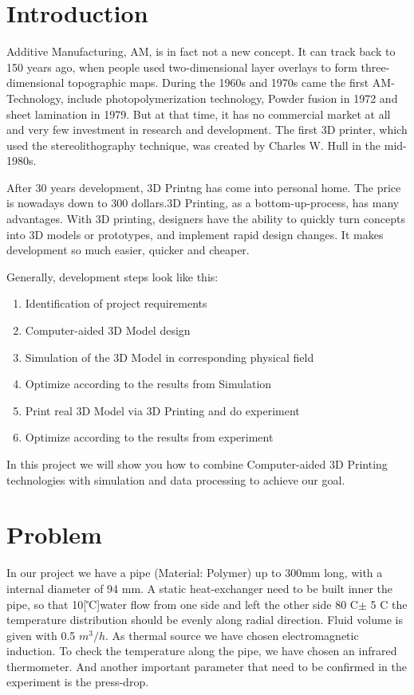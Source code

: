 \documentclass[journal,article,submit,moreauthors,pdftex]{Definitions/mdpi}
\begin{document}

\section{Introduction}

Additive Manufacturing, AM, is in fact not a new concept. It can track back to 150 years ago, when people used two-dimensional layer overlays to form three-dimensional topographic maps. During the 1960s and 1970s came the first AM-Technology, include photopolymerization technology, Powder fusion in 1972 and sheet lamination in 1979. But at that time, it has no commercial market at all and very few investment in research and development. \cite{link-1}
The first 3D printer, which used the stereolithography technique, was created by Charles W. Hull in the mid-1980s. \cite{link-2}

After 30 years development, 3D Printng has come into personal home. The price is nowadays down to 300 dollars.3D Printing, as a bottom-up-process, has many advantages. With 3D printing, designers have the ability to quickly turn concepts into 3D models or prototypes, and implement rapid design changes. It makes development so much easier, quicker and cheaper. 

Generally, development steps look like this: 
\begin{enumerate}
    \item Identification of project requirements
    \item Computer-aided 3D Model design
    \item Simulation of the 3D Model in corresponding physical field
    \item Optimize according to the results from Simulation
    \item Print real 3D Model via 3D Printing and do experiment
    \item Optimize according to the results from experiment
\end{enumerate}


In this project we will show you how to combine Computer-aided 3D Printing technologies with simulation and data processing to achieve our goal.
 
\section{Problem}
In our project we have a pipe (Material: Polymer) up to 300mm long, with a internal diameter of 94 mm. A static heat-exchanger need to be built inner the pipe, so that 10[℃]water flow from one side and left the other side 80 \textdegree{}C$\pm$ 5 \textdegree{}C the temperature distribution should be evenly along radial direction. Fluid volume is given with 0.5 $m^3/h$. As thermal source we have chosen electromagnetic induction. To check the temperature along the pipe, we have chosen an infrared thermometer. And another important parameter that need to be confirmed in the experiment is the press-drop. 
\end{document}
